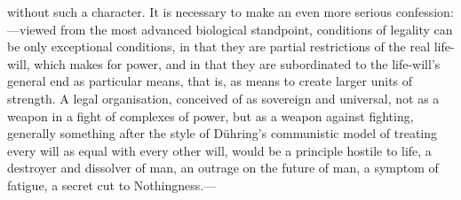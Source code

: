 \documentclass[12pt]{article}
\begin{document}
without such a character. It is necessary to make an even more serious confession:---viewed from the most advanced biological standpoint, conditions of legality can be only exceptional conditions, in that they are partial restrictions of the real life-will, which makes for power, and in that they are subordinated to the life-will's general end as particular means, that is, as means to create larger units of strength. A legal organisation, conceived of as sovereign and universal, not as a weapon in a fight of complexes of power, but as a weapon against fighting, generally something after the style of Dühring's communistic model of treating every will as equal with every other will, would be a principle hostile to life, a destroyer and dissolver of man, an outrage on the future of man, a symptom of fatigue, a secret cut to Nothingness.---
\end{document}
